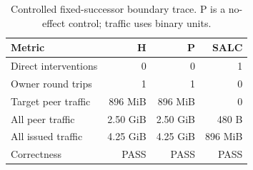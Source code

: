 \begin{table}[t]
\centering
\setlength{\tabcolsep}{3pt}
\caption{Controlled fixed-successor boundary trace. P is a no-effect control; traffic uses binary units.}
\label{tab:controlled-trace}
\begin{tabularx}{\columnwidth}{@{\hspace{5pt}}>{\raggedright\arraybackslash}Xrrr@{\hspace{5pt}}}
\toprule
Metric & H & P & SALC \\
\midrule
Direct interventions & 0 & 0 & 1 \\
Owner round trips & 1 & 1 & 0 \\
Target peer traffic & 896 MiB & 896 MiB & 0 \\
All peer traffic & 2.50 GiB & 2.50 GiB & 480 B \\
All issued traffic & 4.25 GiB & 4.25 GiB & 896 MiB \\
Correctness & PASS & PASS & PASS \\
\bottomrule
\end{tabularx}
\end{table}
